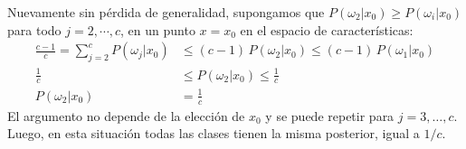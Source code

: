 \documentclass[spanish]{article}
\newcommand{\given}{\vert}
\begin{document}
\begin{enumerate}
        Nuevamente sin pérdida de generalidad, supongamos que $P(\omega_2\given x_0)\ge
        P(\omega_i\given x_0)$ para todo $j = 2, \cdots, c$, en un punto $x = x_0$ en el espacio de
        características:
        \begin{align}
                \frac{c - 1}{c} = \sum_{j=2}^c P(\omega_j\given x_0) 
                &\le (c - 1)\,P(\omega_2\given x_0) \le (c - 1)\,P(\omega_1\given x_0) \\
                \frac{1}{c} &\le P(\omega_2\given x_0) \le \frac{1}{c} \\
                P(\omega_2\given x_0) &= \frac{1}{c}
        \end{align}
        El argumento no depende de la elección de $x_0$ y se puede repetir para $j = 3,\ldots, c$.
        Luego, en esta situación todas las clases tienen la misma posterior, igual a $1/c$.
\end{enumerate}
\end{document}
